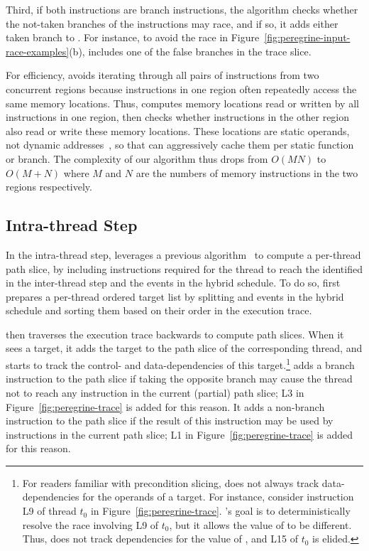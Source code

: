 Third, if both instructions are branch instructions, the algorithm checks
whether the not-taken branches of the instructions may race, and if so, it
adds either taken branch to .
For instance, to avoid the race in Figure~\ref{fig:peregrine-input-race-examples}(b),
\peregrine includes one of the false branches in the trace slice.

For efficiency, \peregrine avoids iterating through all pairs of instructions
from two concurrent regions because instructions in one region often
repeatedly access the same memory locations.  Thus, \peregrine computes memory
locations read or written by all instructions in one region, then checks
whether instructions in the other region also read or write these memory
locations.  These locations are static operands, not dynamic
addresses~\cite{rwset:tacas08}, so that \peregrine can aggressively cache them
per static function or branch.  The complexity of our algorithm thus drops from
$O(MN)$ to $O(M+N)$ where $M$ and $N$ are the numbers of memory
instructions in the two regions respectively.


\subsection{Intra-thread Step} \label{sec:peregrine-intrathread-slice}

In the intra-thread step, \peregrine leverages a previous
algorithm~\cite{castro:bouncer} to compute a per-thread path slice,
by including instructions required for the thread to reach the
 identified in the inter-thread step and the events in
the hybrid schedule.  To do so, \peregrine first prepares a per-thread ordered
target list by splitting  and events in the hybrid
schedule and sorting them based on their order in the execution trace.

\peregrine then traverses the execution trace backwards to compute path slices.
When it sees a target, it adds the target to the path slice of the
corresponding thread, and starts to track the control- and
data-dependencies of this target.\footnote{For readers familiar with
  precondition slicing, \peregrine does not always track data-dependencies for
  the operands of a target.  For instance, consider instruction
  L9 of thread $t_0$ in Figure~\ref{fig:peregrine-trace}.  \peregrine's goal is
  to deterministically resolve the race involving L9 of $t_0$, but it
  allows the value of  to be different.  Thus, \peregrine does not
  track dependencies for the value of , and L15 of $t_0$ is elided.}
  \peregrine adds a branch
instruction to the path slice if taking the opposite branch may cause the
thread not to reach any instruction in the current (partial) path slice;
L3 in Figure~\ref{fig:peregrine-trace} is added for this reason.
It adds a non-branch instruction to the path slice if the result of this
instruction may be used by instructions in the current path slice;
L1 in Figure~\ref{fig:peregrine-trace} is added for this reason.

